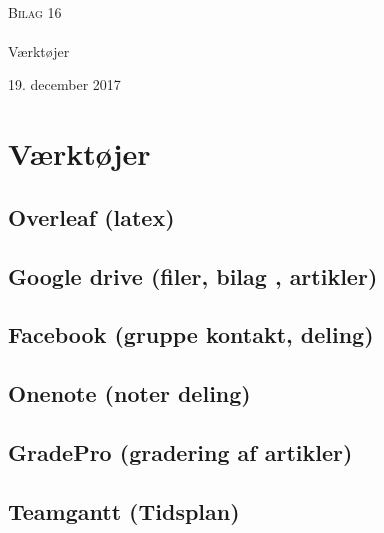 

\begin{titlingpage}
\begin{center}

~ \\[3cm]

\textsc{\LARGE Bilag 16}\\[1.5cm]


\noindent\makebox[\linewidth]{\rule{\textwidth}{0.4pt}}\\
[0.5cm]{\Huge Værktøjer}
\noindent\makebox[\linewidth]{\rule{\textwidth}{0.4pt}}
\end{center}
\vfill
\begin{center}
{\large 19. december 2017}
\end{center}
\end{titlingpage}

\newpage
\tableofcontents*
\newpage

\chapter{Værktøjer}

\section{Overleaf (latex)} 
\section{Google drive (filer, bilag , artikler)}
\section{Facebook (gruppe kontakt, deling)}
\section{Onenote (noter deling)}
\section{GradePro (gradering af artikler)}
\section{Teamgantt (Tidsplan)}
